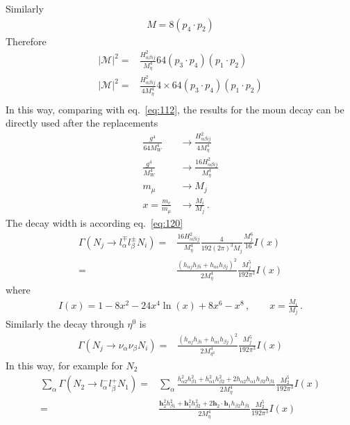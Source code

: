 Similarly
\begin{align}
  M=8(p_4\cdot p_2)
\end{align}
Therefore
\begin{align}
  \left|\mathcal{M}\right|^2=&\frac{H_{\alpha\beta i j}^2}{M_\eta^4}64(p_3\cdot p_4)(p_1\cdot p_2)\nonumber\\
  \left|\mathcal{M}\right|^2=&\frac{H_{\alpha\beta i j}^2}{4M_\eta^4}4\times64(p_3\cdot p_4)(p_1\cdot p_2)\nonumber\\
\end{align}
In this way, comparing with eq.~\eqref{eq:112}, the results for the moun decay can be directly used after the replacements
\begin{align}
  \frac{g^4}{64 M_W^4}&\to\frac{H_{\alpha\beta i j}^2}{4M_\eta^4}\nonumber\\
  \frac{g^4}{M_W^4}&\to\frac{16H_{\alpha\beta i j}^2}{M_\eta^4}\nonumber\\
  m_\mu&\to M_j\nonumber\\
  x=\frac{m_e}{m_\mu}&\to\frac{M_i}{M_j}\,.
\end{align}
The decay width is according eq.~\eqref{eq:120}
\begin{align}
  \label{eq:121}
  \Gamma(N_j\to l_\alpha^\mp l_\beta^\pm N_i)=&\frac{16H_{\alpha\beta ij}^2}{M_\eta^4}
  \frac{4}{192 (2\pi)^3 M_j }\frac{M_j^6}{16}I\left(x\right)\nonumber\\
=&\frac{(h_{\alpha j}h_{\beta i}+h_{\alpha i}h_{\beta j})^2}{2 M_\eta^4}
  \frac{M_j^5}{192 \pi^3}{}I\left(x\right)
\end{align}
where
\begin{align}
  I(x)=1-8x^2-24x^4\ln(x)+8x^6-x^8\,,\qquad x=\frac{M_i}{M_j}\,.
\end{align}
Similarly the decay through $\eta^0$ is
\begin{align}
  \label{eq:122}
   \Gamma(N_j\to\nu_\alpha\nu_\beta N_i)
=&\frac{(h_{\alpha j}h_{\beta i}+h_{\alpha i}h_{\beta j})^2}{2 M_{\eta^0}^4}
  \frac{M_j^5}{192 \pi^3}{}I\left(x\right)
\end{align}
In this way, for example for $N_2$
\begin{align}
  \sum_{\alpha}\Gamma(N_2\to l_\alpha^- l_\beta^+ N_1)=&\sum_\alpha\frac{h_{\alpha2}^2h_{\beta1}^2+h_{\alpha1}^2h_{\beta2}^2+2h_{\alpha2}h_{\alpha1}h_{\beta2}h_{\beta1}}{2 M_\eta^4}
  \frac{M_2^5}{192 \pi^3}{}I\left(x\right)\nonumber\\
 =&\frac{\mathbf{h}_2^2h^2_{\beta1}+\mathbf{h}_1^2h^2_{\beta2}+2\mathbf{h}_2\cdot\mathbf{h}_1h_{\beta2}h_{\beta1}}{2 M_\eta^4}
  \frac{M_2^5}{192 \pi^3}{}I\left(x\right)
\end{align}
